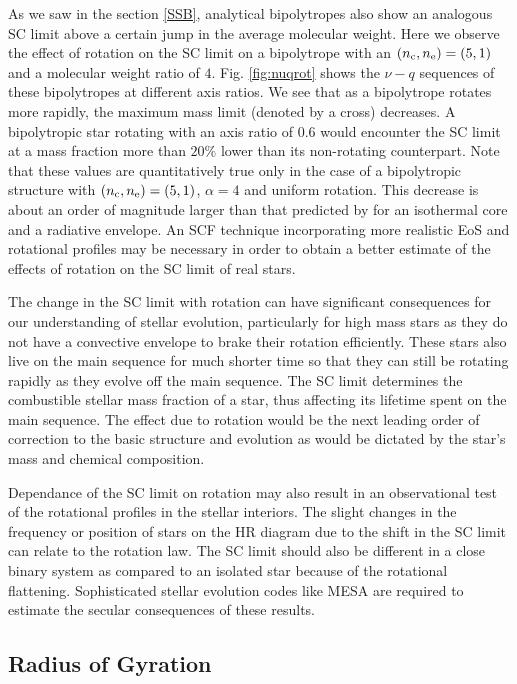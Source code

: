 \documentclass[a4paper,fleqn,usenatbib]{mnras}
\begin{document}
As we saw in the section \ref{SSB}, analytical bipolytropes also show an analogous SC limit above a certain jump in the average molecular weight. 
Here we observe the effect of rotation on the SC limit on a bipolytrope with an $(n_{\rm c},n_{\rm e})=(5,1)$  and a molecular weight ratio of $4$. 
Fig. \ref{fig:nuqrot} shows the $\nu-q$ sequences of these bipolytropes at different axis ratios. 
We see that 
as a bipolytrope rotates more rapidly, the maximum mass limit (denoted by a cross) decreases. A bipolytropic star rotating with an axis ratio of $0.6$ would encounter the SC limit at a mass fraction more than $20 \%$ lower than its non-rotating counterpart. 
Note that these values are quantitatively true only in the case of a bipolytropic structure with $(n_{\rm c},n_{\rm e})=(5,1)$, $\alpha=4$ and uniform rotation. 
This decrease is about an order of magnitude larger than that predicted by \cite{Maeder1971} for an isothermal core and a radiative envelope.
An SCF technique incorporating more realistic EoS and rotational profiles may be necessary in order to obtain a better estimate of the effects of rotation on the SC limit of real stars.

The change in the SC limit with rotation can have significant consequences for our understanding of stellar evolution, particularly for high mass stars as they do not have a convective envelope to brake their rotation efficiently. These stars also live on the main sequence for much shorter time so that they can still be rotating rapidly as they evolve off the main sequence. 
The SC limit determines the combustible stellar mass fraction of a star, thus affecting its lifetime spent on the main sequence. 
The effect due to rotation would be the next leading order of correction to the basic structure and evolution as would be dictated by the star's mass and chemical composition. 

Dependance of the SC limit on rotation may also result in an observational test of the rotational profiles in the stellar interiors. The slight changes in the frequency or position of stars on the HR diagram due to the shift in the SC limit can relate to the rotation law.
The SC limit should also be different in a close binary system as compared to an isolated star because of the rotational flattening. 
Sophisticated stellar evolution codes like MESA \citep{Mesa2011} are required to estimate the secular consequences of these results. 


\subsection{Radius of Gyration}
\end{document}
